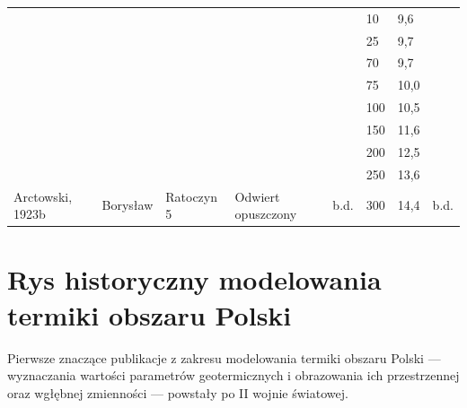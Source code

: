 \documentclass[11.5pt,twoside]{report}
\begin{document}
\begin{table}
\begin{tabular}{llllllll}
		&  &  &  &  & 10 & 9,6 &  \\
		&  &  &  &  & 25 & 9,7 &  \\
		&  &  &  &  & 70 & 9,7 &  \\
		&  &  &  &  & 75 & 10,0 &  \\
		&  &  &  &  & 100 & 10,5 &  \\
		&  &  &  &  & 150 & 11,6 &  \\
		&  &  &  &  & 200 & 12,5 &  \\
		&  &  &  &  & 250 & 13,6 &  \\
		\multirow{-9}{*}{Arctowski, 1923b} & \multirow{-9}{*}{Borysław} & \multirow{-9}{*}{Ratoczyn 5} & \multirow{-9}{*}{Odwiert opuszczony} & \multirow{-9}{*}{b.d.} & 300 & 14,4 & \multirow{-9}{*}{b.d.} \\ \hline
	\end{tabular}
\end{table}

\section{Rys historyczny modelowania termiki obszaru Polski}

Pierwsze znaczące publikacje z zakresu modelowania termiki obszaru Polski --- wyznaczania wartości parametrów geotermicznych i obrazowania ich przestrzennej oraz wgłębnej zmienności --- powstały po II wojnie światowej. 
\end{document}
